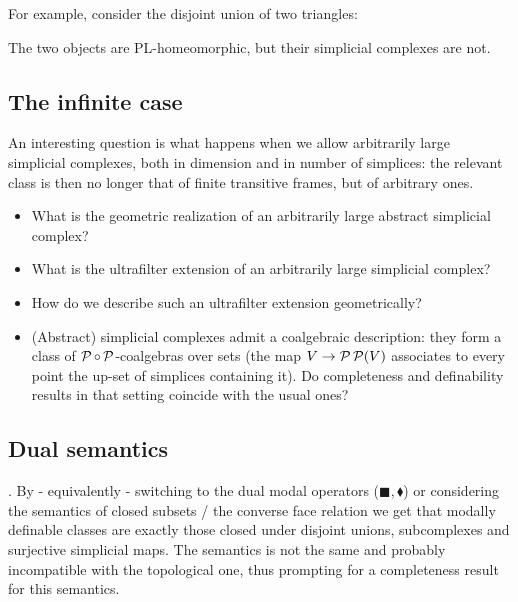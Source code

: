 For example, consider the disjoint union of two triangles:
\begin{figure}[H]
  \centering
\end{figure}

The two objects are PL-homeomorphic, but their simplicial complexes are not.
\subsection{The infinite case}

An interesting question is what happens when we allow arbitrarily large simplicial complexes, both in dimension and in number of simplices: the relevant class is then no longer that of finite transitive frames, but of arbitrary ones.
\begin{itemize}
    \item What is the geometric realization of an arbitrarily large abstract simplicial complex?
    \item What is the ultrafilter extension of an arbitrarily large simplicial complex?
    \item How do we describe such an ultrafilter extension geometrically?
    \item (Abstract) simplicial complexes admit a coalgebraic description: they form a class of $\operatorname{\mathcal{P}}\circ \operatorname{\mathcal{P}}$-coalgebras over sets
    (the map $V\to \operatorname{\mathcal{P}}\operatorname{\mathcal{P}}(V)$ associates to every point the up-set of simplices containing it).
    Do completeness and definability results in that setting coincide with the usual ones?
\end{itemize}

\subsection{Dual semantics}.
By - equivalently - switching to the dual modal operators ($\blacksquare,\blacklozenge$) or considering the 
semantics of closed subsets / the converse face relation we get that modally definable classes 
are exactly those closed under disjoint unions, subcomplexes and surjective simplicial maps.
The semantics is not the same and probably incompatible with the topological one, thus prompting for 
a completeness result for this semantics.
